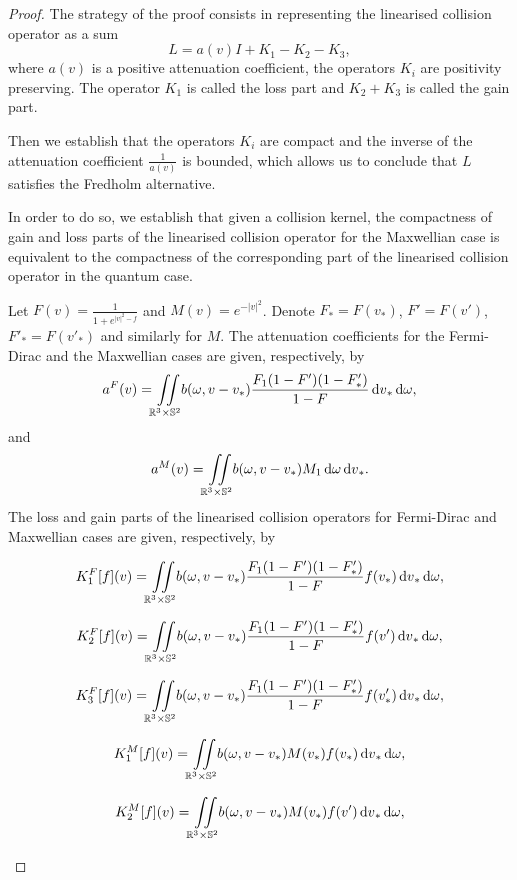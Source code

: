 \begin{proof}
The strategy of the proof consists in representing the linearised collision operator as a sum
\[L=a(v)I+K_1-K_2-K_3,\]
where $a(v)$ is a positive attenuation coefficient, the operators $K_i$ are positivity preserving. The operator $K_1$ is called the loss part and $K_2+K_3$ is called the gain part.

Then we establish that the operators $K_i$ are compact and the inverse of the attenuation coefficient $\frac{1}{a(v)}$ is bounded, which allows us to conclude that $L$ satisfies the Fredholm alternative.


In order to do so, we establish that given a collision kernel, the compactness of gain and loss parts of the linearised collision operator for the Maxwellian case is equivalent to the compactness of the corresponding part of the linearised collision operator in the quantum case.


\begin{lemma}\label{lemma:comp:equiv} Let $F(v)=\frac{1}{1+e^{|v|^2-f}}$ and $M(v) = e^{-|v|^2}$. Denote $F_\ast=F(v_\ast )$, $F' = F(v')$, $F'_\ast =F(v'_\ast )$ and similarly for $M$. The attenuation coefficients for the Fermi-Dirac and the Maxwellian  cases are given, respectively, by
\[a^F(v) = {\iint\limits_{\mathbb R^3\times\mathbb S^2}} b (\omega,v-v_\ast )\frac{F_1(1-F')(1-F'_\ast )}{1-F} {\,\mathrm{d} v}_\ast  {\,\mathrm{d} \omega} ,\]
and
\[a^M(v) = {\iint\limits_{\mathbb R^3\times\mathbb S^2}} b (\omega,v-v_\ast ) M_1 {\,\mathrm{d} \omega}  {\,\mathrm{d} v}_\ast .\]
The loss and gain parts of the linearised collision operators for Fermi-Dirac and Maxwellian cases are given, respectively, by

\[
K^F_1[f](v) = {\iint\limits_{\mathbb R^3\times\mathbb S^2}} b (\omega,v-v_\ast )\frac{F_1(1-F')(1-F'_\ast )}{1-F} f(v_\ast ) {\,\mathrm{d} v}_\ast  {\,\mathrm{d} \omega},
\]

\[
K^F_2[f](v) = {\iint\limits_{\mathbb R^3\times\mathbb S^2}} b (\omega,v-v_\ast )\frac{F_1(1-F')(1-F'_\ast )}{1-F}f(v') {\,\mathrm{d} v}_\ast  {\,\mathrm{d} \omega},
\]

\[
K^F_3[f](v) = {\iint\limits_{\mathbb R^3\times\mathbb S^2}} b(\omega,v-v_\ast )\frac{F_1(1-F')(1-F'_\ast )}{1-F} f(v'_\ast ){\,\mathrm{d} v}_\ast  {\,\mathrm{d} \omega} ,
\]

\[
K^M_1[f](v) = {\iint\limits_{\mathbb R^3\times\mathbb S^2}} b (\omega,v-v_\ast )M(v_\ast ) f(v_\ast ) {\,\mathrm{d} v}_\ast  {\,\mathrm{d} \omega} ,
\]

\[
K^M_2[f](v) = {\iint\limits_{\mathbb R^3\times\mathbb S^2}} b (\omega,v-v_\ast )M(v_\ast )f(v') {\,\mathrm{d} v}_\ast  {\,\mathrm{d} \omega} ,
\]


\end{lemma}
\end{proof}

